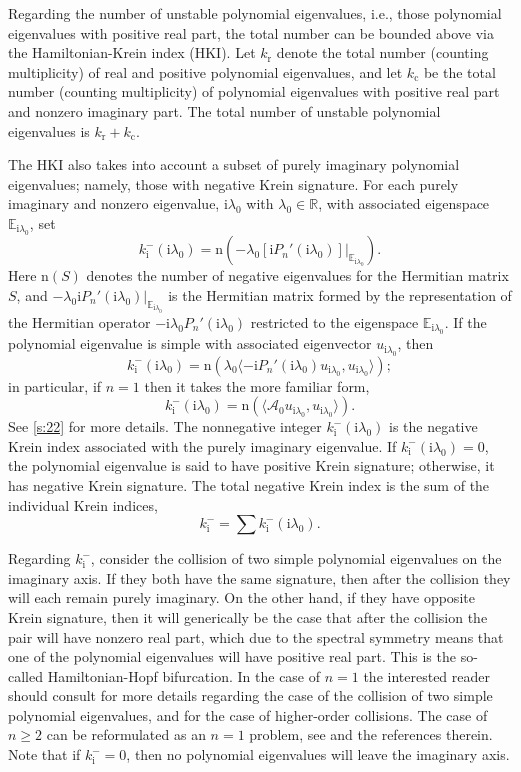 \documentclass[review,onefignum,onetabnum]{siamart171218}
\newcommand{\E}{\mathbb{E}}
\newcommand{\R}{\mathbb{R}}
\newcommand{\rmc}{\mathrm{c}}
\newcommand{\rmi}{\mathrm{i}}
\newcommand{\rmn}{\mathrm{n}}
\newcommand{\rmr}{\mathrm{r}}
\newcommand{\calA}{\mathcal{A}}
\newcommand{\vS}{\bm{\mathit{S}}}
\begin{document}
Regarding the number of unstable polynomial eigenvalues, i.e., those
polynomial eigenvalues with positive real part, the total number can be
bounded above via the Hamiltonian-Krein index (HKI). Let $k_\rmr$ denote the
total number (counting multiplicity) of real and positive polynomial
eigenvalues, and let $k_\rmc$ be the total number (counting multiplicity) of
polynomial eigenvalues with positive real part and nonzero imaginary part.
The total number of unstable polynomial eigenvalues is $k_\rmr+k_\rmc$.

The HKI also takes into account a subset of purely imaginary polynomial
eigenvalues; namely, those with negative Krein signature. For each purely
imaginary and nonzero eigenvalue, $\rmi\lambda_0$ with $\lambda_0\in\R$, with
associated eigenspace $\E_{\rmi\lambda_0}$, set
\[
k_\rmi^-(\rmi\lambda_0)=\rmn\left(-\lambda_0\left[\rmi P_n'(\rmi\lambda_0)\right]|_{\E_{\rmi\lambda_0}}\right).
\]
Here $\rmn(\vS)$ denotes the number of negative eigenvalues for the Hermitian
matrix $\vS$, and $-\lambda_0\rmi P_n'(\rmi\lambda_0)|_{\E_{\rmi\lambda_0}}$ is the
Hermitian matrix formed by the representation of the Hermitian operator
$-\rmi\lambda_0P_n'(\rmi\lambda_0)$ restricted to the eigenspace
$\E_{\rmi\lambda_0}$. If the polynomial eigenvalue is simple with associated
eigenvector $u_{\rmi\lambda_0}$, then
\[
k_\rmi^-(\rmi\lambda_0)=
\rmn\left(\lambda_0\langle-\rmi P_n'(\rmi\lambda_0)u_{\rmi\lambda_0},u_{\rmi\lambda_0}\rangle\right);
\]
in particular, if $n=1$ then it takes the more familiar form,
\[
k_\rmi^-(\rmi\lambda_0)=
\rmn\left(\langle\calA_0u_{\rmi\lambda_0},u_{\rmi\lambda_0}\rangle\right).
\]
See \cref{s:22} for more details. The nonnegative integer $k_\rmi^-(\rmi\lambda_0)$ is the negative Krein index
associated with the purely imaginary eigenvalue. If
$k_\rmi^-(\rmi\lambda_0)=0$, the polynomial eigenvalue is said to have
positive Krein signature; otherwise, it has negative Krein signature. The
total negative Krein index is the sum of the individual Krein indices,
\[
k_\rmi^-=\sum k_\rmi^-(\rmi\lambda_0).
\]

Regarding $k_\rmi^-$, consider the
collision of two simple polynomial eigenvalues on the imaginary axis. If they both have the same
signature, then after the collision they will each remain purely imaginary.
On the other hand, if they have opposite Krein signature, then it will
generically be the case that after the collision the pair will have nonzero
real part, which due to the spectral symmetry means that one of the
polynomial eigenvalues will have positive real part. This is the so-called Hamiltonian-Hopf bifurcation. In the case of $n=1$ the interested reader
should consult \cite[Chapter~7.1]{kapitula:sad13} for more details regarding
the case of the collision of two simple polynomial  eigenvalues, and
\cite{kapitula:tks10,vougalter:eoz06} for the case of higher-order
collisions. The case of $n\ge2$ can be reformulated as an $n=1$ problem, see \cite{kapitula:iif13} and the references therein. Note that if $k_\rmi^-=0$, then no polynomial eigenvalues will leave the imaginary axis.
\end{document}
